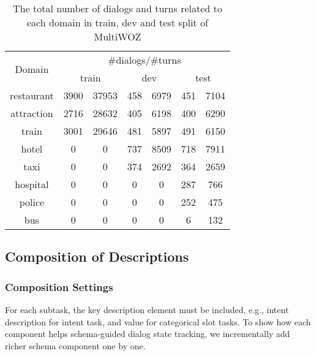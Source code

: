\begin{table}[!h]
\begin{center}{\scriptsize
\setlength{\tabcolsep}{3pt}
\begin{tabular}{ccccccc}
 \toprule

\multirow{2}{*}{Domain } & \multicolumn{6}{c}{\#dialogs/\#turns}                                                \\ \cmidrule{2-7}
                         & \multicolumn{2}{c}{ train } & \multicolumn{2}{c}{ dev } & \multicolumn{2}{c}{ test } \\ \hline
restaurant               & 3900                        & 37953                     & 458 & 6979 & 451 & 7104    \\
attraction               & 2716                        & 28632                     & 405 & 6198 & 400 & 6290    \\
train                    & 3001                        & 29646                     & 481 & 5897 & 491 & 6150    \\
hotel                    & 0                           & 0                         & 737 & 8509 & 718 & 7911    \\
taxi                     & 0                           & 0                         & 374 & 2692 & 364 & 2659    \\
hospital                 & 0                           & 0                         & 0   & 0    & 287 & 766     \\
police                   & 0                           & 0                         & 0   & 0    & 252 & 475     \\
bus                      & 0                           & 0                         & 0   & 0    & 6   & 132     \\
 \bottomrule
\end{tabular}}
\end{center}
\caption{\label{tbl:multiwoz-remix} The total number of dialogs and
  turns related to each domain in train, dev and test split of MultiWOZ}
\end{table}

\subsection{Composition of Descriptions}
\label{ssec:com-desc}

\subsubsection{Composition Settings}
\label{sssec:com-settings}
For each subtask, the key description element must be included, e.g.,
intent description for intent task, and value for categorical slot
tasks.  To show how each component helps schema-guided dialog state
tracking, we incrementally add richer schema component one by one.

